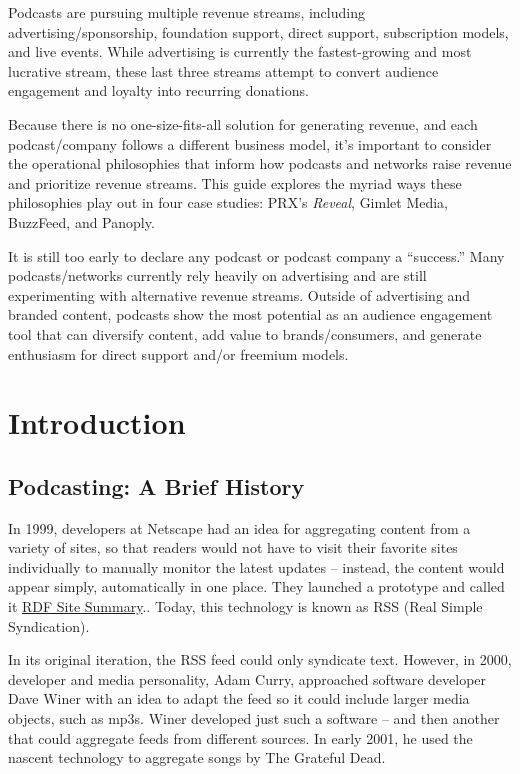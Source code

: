 \documentclass[notoc, symmetric, nobib, nols]{towcenter-guideto-book}
\begin{document}
Podcasts are pursuing multiple revenue streams, including advertising/sponsorship, foundation support, direct support, subscription models, and live events. While advertising is currently the fastest-growing and most lucrative stream, these last three streams attempt to convert audience engagement and loyalty into recurring donations. 

Because there is no one-size-fits-all solution for generating revenue, and each podcast/company follows a different business model, it's important to consider the operational philosophies that inform how podcasts and networks raise revenue and prioritize revenue streams. This guide explores the myriad ways these philosophies play out in four case studies: PRX's \textit{Reveal}, Gimlet Media, BuzzFeed, and Panoply. 

It is still too early to declare any podcast or podcast company a ``success.'' Many podcasts/networks currently rely heavily on advertising and are still experimenting with alternative revenue streams. Outside of advertising and branded content, podcasts show the most potential as an audience engagement tool that can diversify content, add value to brands/consumers, and generate enthusiasm for direct support and/or freemium models. 

\chapter{Introduction}

\section{Podcasting: A Brief History}

In 1999, developers at Netscape had an idea for aggregating content from a variety of sites, so that readers would not have to visit their favorite sites individually to manually monitor the latest updates -- instead, the content would appear simply, automatically in one place.\autocite{WhatisRSS} They launched a prototype and called it \href{https://en.wikipedia.org/wiki/RSS}{RDF Site Summary}.\autocite{RSSWiki}. Today, this technology is known as RSS (Real Simple Syndication). 

In its original iteration, the RSS feed could only syndicate text. However, in 2000, developer and media personality, Adam Curry, approached software developer Dave Winer with an idea to adapt the feed so it could include larger media objects, such as mp3s. Winer developed just such a software -- and then another that could aggregate feeds from different sources. In early 2001, he used the nascent technology to aggregate songs by The Grateful Dead.\autocite{Winer}
\end{document}
